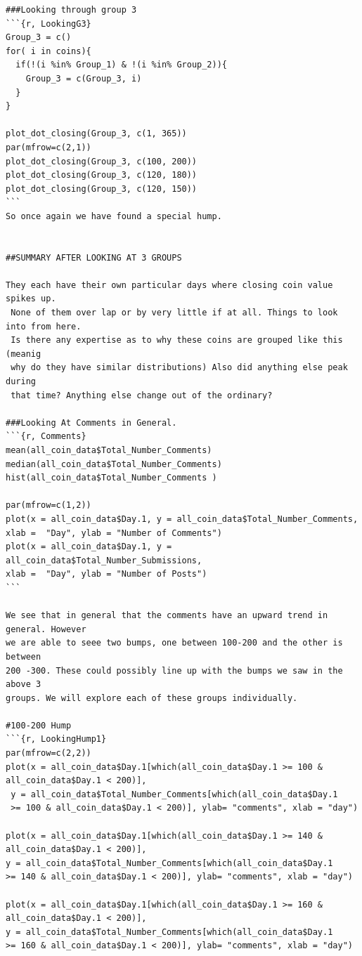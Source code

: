 \documentclass[12pt]{article}
\begin{document}
{\begin{verbatim}
###Looking through group 3
```{r, LookingG3}
Group_3 = c()
for( i in coins){
  if(!(i %in% Group_1) & !(i %in% Group_2)){
    Group_3 = c(Group_3, i)
  }
}

plot_dot_closing(Group_3, c(1, 365))
par(mfrow=c(2,1))
plot_dot_closing(Group_3, c(100, 200))
plot_dot_closing(Group_3, c(120, 180))
plot_dot_closing(Group_3, c(120, 150))
```
So once again we have found a special hump. 


##SUMMARY AFTER LOOKING AT 3 GROUPS

They each have their own particular days where closing coin value spikes up.
 None of them over lap or by very little if at all. Things to look into from here. 
 Is there any expertise as to why these coins are grouped like this (meanig 
 why do they have similar distributions) Also did anything else peak during 
 that time? Anything else change out of the ordinary?

###Looking At Comments in General.
```{r, Comments}
mean(all_coin_data$Total_Number_Comments)
median(all_coin_data$Total_Number_Comments)
hist(all_coin_data$Total_Number_Comments )

par(mfrow=c(1,2))
plot(x = all_coin_data$Day.1, y = all_coin_data$Total_Number_Comments, 
xlab =  "Day", ylab = "Number of Comments")
plot(x = all_coin_data$Day.1, y = all_coin_data$Total_Number_Submissions, 
xlab =  "Day", ylab = "Number of Posts")
```

We see that in general that the comments have an upward trend in general. However 
we are able to seee two bumps, one between 100-200 and the other is between 
200 -300. These could possibly line up with the bumps we saw in the above 3 
groups. We will explore each of these groups individually.

#100-200 Hump
```{r, LookingHump1}
par(mfrow=c(2,2))
plot(x = all_coin_data$Day.1[which(all_coin_data$Day.1 >= 100 & all_coin_data$Day.1 < 200)],
 y = all_coin_data$Total_Number_Comments[which(all_coin_data$Day.1 
 >= 100 & all_coin_data$Day.1 < 200)], ylab= "comments", xlab = "day")

plot(x = all_coin_data$Day.1[which(all_coin_data$Day.1 >= 140 & all_coin_data$Day.1 < 200)], 
y = all_coin_data$Total_Number_Comments[which(all_coin_data$Day.1 
>= 140 & all_coin_data$Day.1 < 200)], ylab= "comments", xlab = "day")

plot(x = all_coin_data$Day.1[which(all_coin_data$Day.1 >= 160 & all_coin_data$Day.1 < 200)], 
y = all_coin_data$Total_Number_Comments[which(all_coin_data$Day.1 
>= 160 & all_coin_data$Day.1 < 200)], ylab= "comments", xlab = "day")


\end{verbatim}}
\end{document}
